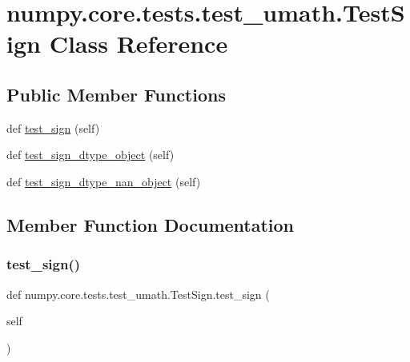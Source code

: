 \hypertarget{classnumpy_1_1core_1_1tests_1_1test__umath_1_1TestSign}{}\section{numpy.\+core.\+tests.\+test\+\_\+umath.\+Test\+Sign Class Reference}
\label{classnumpy_1_1core_1_1tests_1_1test__umath_1_1TestSign}
\subsection*{Public Member Functions}
\begin{DoxyCompactItemize}
\item 
def \hyperlink{classnumpy_1_1core_1_1tests_1_1test__umath_1_1TestSign_a1efc99f409f8e299da1de88a983896b0}{test\+\_\+sign} (self)
\item 
def \hyperlink{classnumpy_1_1core_1_1tests_1_1test__umath_1_1TestSign_a141d0fbf1c24501ff7073f3c1a20a93a}{test\+\_\+sign\+\_\+dtype\+\_\+object} (self)
\item 
def \hyperlink{classnumpy_1_1core_1_1tests_1_1test__umath_1_1TestSign_ae114ea5d5745f8428a97356df283dddd}{test\+\_\+sign\+\_\+dtype\+\_\+nan\+\_\+object} (self)
\end{DoxyCompactItemize}


\subsection{Member Function Documentation}
\mbox{\label{classnumpy_1_1core_1_1tests_1_1test__umath_1_1TestSign_a1efc99f409f8e299da1de88a983896b0}} 
\subsubsection{\texorpdfstring{test\+\_\+sign()}{test\_sign()}}
{\footnotesize\ttfamily def numpy.\+core.\+tests.\+test\+\_\+umath.\+Test\+Sign.\+test\+\_\+sign (\begin{DoxyParamCaption}\item[{}]{self }\end{DoxyParamCaption})}

